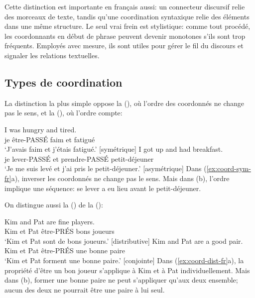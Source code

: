 Cette distinction est importante en français aussi: un connecteur discursif relie des morceaux de texte, tandis qu'une coordination syntaxique relie des éléments dans une même structure. Le seul vrai frein est stylistique: comme tout procédé, les coordonnants en début de phrase peuvent devenir monotones s'ils sont trop fréquents. Employés avec mesure, ils sont utiles pour gérer le fil du discours et signaler les relations textuelles.

\subsection{Types de coordination}

La distinction la plus simple oppose la  (), où l'ordre des coordonnés ne change pas le sens, et la  (), où l'ordre compte:

\ea \label{ex:coord-sym-fr}
    \ea \gll I was hungry and tired.\\
        je être-PASSÉ faim et fatigué\\
    \glt `J'avais faim et j'étais fatigué.' [symétrique]
    \ex \gll I got up and had breakfast.\\
        je lever-PASSÉ et prendre-PASSÉ petit-déjeuner\\
    \glt `Je me suis levé et j'ai pris le petit-déjeuner.' [asymétrique]
    \z
\z
Dans (\ref{ex:coord-sym-fr}a), inverser les coordonnés ne change pas le sens. Mais dans (b), l'ordre implique une séquence: se lever a eu lieu avant le petit-déjeuner.

On distingue aussi la  () de la  ():

\ea \label{ex:coord-dist-fr}
    \ea \gll Kim and Pat are fine players.\\
        Kim et Pat être-PRÉS bons joueurs\\
    \glt `Kim et Pat sont de bons joueurs.' [distributive]
    \ex \gll Kim and Pat are a good pair.\\
        Kim et Pat être-PRÉS une bonne paire\\
    \glt `Kim et Pat forment une bonne paire.' [conjointe]
    \z
\z
Dans (\ref{ex:coord-dist-fr}a), la propriété d'être un bon joueur s'applique à Kim et à Pat individuellement. Mais dans (b), former une bonne paire ne peut s'appliquer qu'aux deux ensemble; aucun des deux ne pourrait être une paire à lui seul.

